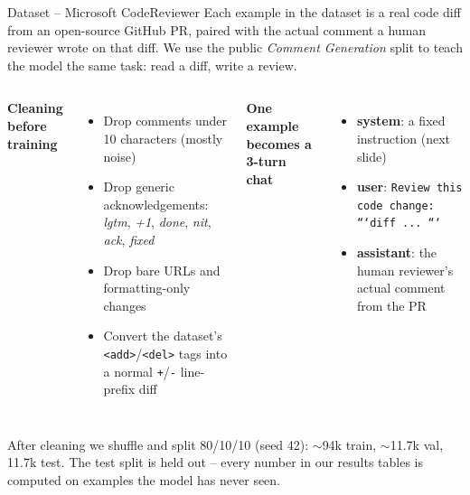 \documentclass[10pt,aspectratio=169]{beamer}
\begin{document}
\begin{frame}{Dataset -- Microsoft CodeReviewer}
  \footnotesize Each example in the dataset is a real code diff from an open-source GitHub PR, paired
  with the actual comment a human reviewer wrote on that diff. We use the public
  \textit{Comment Generation} split to teach the model the same task: read a diff, write a
  review.
  \vspace{0.4em}

  \begin{columns}[T,onlytextwidth]
      \footnotesize\textbf{Cleaning before training}
      \begin{itemize}\scriptsize
        \item Drop comments under 10 characters (mostly noise)
        \item Drop generic acknowledgements: \textit{lgtm}, \textit{+1}, \textit{done}, \textit{nit}, \textit{ack}, \textit{fixed}
        \item Drop bare URLs and formatting-only changes
        \item Convert the dataset's \texttt{<add>}/\texttt{<del>} tags into a normal \texttt{+}/\texttt{-} line-prefix diff
      \end{itemize}
      \footnotesize\textbf{One example becomes a 3-turn chat}
      \begin{itemize}\scriptsize
        \item \textbf{system}: a fixed instruction (next slide)
        \item \textbf{user}: \texttt{Review this code change: ```diff ... ```}
        \item \textbf{assistant}: the human reviewer's actual comment from the PR
      \end{itemize}
  \end{columns}
  \vspace{0.6em}

  \footnotesize After cleaning we shuffle and split 80/10/10 (seed 42): \alert{$\sim$94k train},
  \alert{$\sim$11.7k val}, \alert{11.7k test}. The test split is held out -- every number in our
  results tables is computed on examples the model has never seen.
  \vspace{0.4em}
\end{frame}
\end{document}
